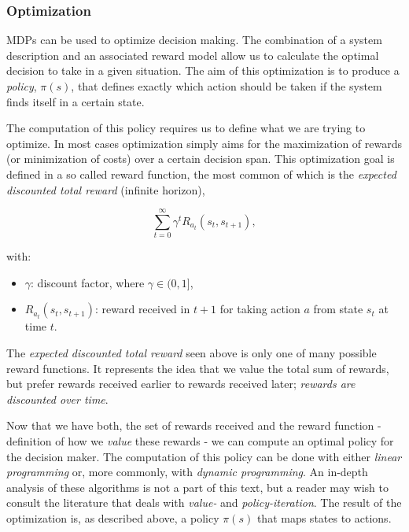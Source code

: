 \subsubsection{Optimization}

MDPs can be used to optimize decision making. The combination of a system description and an associated reward model allow us to calculate the optimal decision to take in a given situation. The aim of this optimization is to produce a \textit{policy}, $\pi(s)$, that defines exactly which action should be taken if the system finds itself in a certain state.

The computation of this policy requires us to define what we are trying to optimize. In most cases optimization simply aims for the maximization of rewards (or minimization of costs) over a certain decision span. This optimization goal is defined in a so called reward function, the most common of which is the \textit{expected discounted total reward} (infinite horizon),

\[
\sum_{t=0}^{\infty} {\gamma}^{t}R_{a_t}(s_t,s_{t+1}),
\]

with:
\begin{itemize}
\item $\gamma$: discount factor, where $\gamma\in(0,1]$,
\item $R_{a_t}(s_t,s_{t+1})$: reward received in $t+1$ for taking action $a$ from state $s_t$ at time $t$.	
\end{itemize}

The \textit{expected discounted total reward} seen above is only one of many possible reward functions. It represents the idea that we value the total sum of rewards, but prefer rewards received earlier to rewards received later; \textit{rewards are discounted over time}.

Now that we have both, the set of rewards received and the reward function - definition of how we \textit{value} these rewards - we can compute an optimal policy for the decision maker. The computation of this policy can be done with either \textit{linear programming} or, more commonly, with \textit{dynamic programming}. An in-depth analysis of these algorithms is not a part of this text, but a reader may wish to consult the literature \cite{puterman} that deals with \textit{value-} and \textit{policy-iteration}. The result of the optimization is, as described above, a policy $\pi(s)$ that maps states to actions.